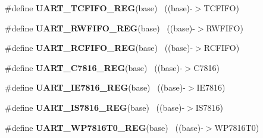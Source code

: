 \begin{DoxyCompactItemize}
\item 
\hypertarget{group___u_a_r_t___register___accessor___macros_ga3c989ec09106d40a7499376ee50043cb}{}\#define {\bfseries U\+A\+R\+T\+\_\+\+T\+C\+F\+I\+F\+O\+\_\+\+R\+E\+G}(base)                                    ~((base)-\/$>$T\+C\+F\+I\+F\+O)\label{group___u_a_r_t___register___accessor___macros_ga3c989ec09106d40a7499376ee50043cb}

\item 
\hypertarget{group___u_a_r_t___register___accessor___macros_ga3835d8ca2bff395228fd298041588e27}{}\#define {\bfseries U\+A\+R\+T\+\_\+\+R\+W\+F\+I\+F\+O\+\_\+\+R\+E\+G}(base)                                    ~((base)-\/$>$R\+W\+F\+I\+F\+O)\label{group___u_a_r_t___register___accessor___macros_ga3835d8ca2bff395228fd298041588e27}

\item 
\hypertarget{group___u_a_r_t___register___accessor___macros_ga45b1614543eafe052567800963874056}{}\#define {\bfseries U\+A\+R\+T\+\_\+\+R\+C\+F\+I\+F\+O\+\_\+\+R\+E\+G}(base)                                    ~((base)-\/$>$R\+C\+F\+I\+F\+O)\label{group___u_a_r_t___register___accessor___macros_ga45b1614543eafe052567800963874056}

\item 
\hypertarget{group___u_a_r_t___register___accessor___macros_ga21a48aa0a2ba6e0202b47d6ff091e689}{}\#define {\bfseries U\+A\+R\+T\+\_\+\+C7816\+\_\+\+R\+E\+G}(base)                                      ~((base)-\/$>$C7816)\label{group___u_a_r_t___register___accessor___macros_ga21a48aa0a2ba6e0202b47d6ff091e689}

\item 
\hypertarget{group___u_a_r_t___register___accessor___macros_ga5b90f8b81565b881d6c249581ebcbb75}{}\#define {\bfseries U\+A\+R\+T\+\_\+\+I\+E7816\+\_\+\+R\+E\+G}(base)                                    ~((base)-\/$>$I\+E7816)\label{group___u_a_r_t___register___accessor___macros_ga5b90f8b81565b881d6c249581ebcbb75}

\item 
\hypertarget{group___u_a_r_t___register___accessor___macros_ga70744022bbc57cc63807b79daa7b3341}{}\#define {\bfseries U\+A\+R\+T\+\_\+\+I\+S7816\+\_\+\+R\+E\+G}(base)                                    ~((base)-\/$>$I\+S7816)\label{group___u_a_r_t___register___accessor___macros_ga70744022bbc57cc63807b79daa7b3341}

\item 
\hypertarget{group___u_a_r_t___register___accessor___macros_ga36fcbef228d29a709d9a879a73710e42}{}\#define {\bfseries U\+A\+R\+T\+\_\+\+W\+P7816\+T0\+\_\+\+R\+E\+G}(base)                                ~((base)-\/$>$W\+P7816\+T0)\label{group___u_a_r_t___register___accessor___macros_ga36fcbef228d29a709d9a879a73710e42}


\end{DoxyCompactItemize}
